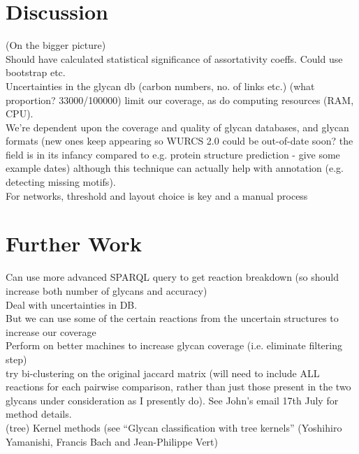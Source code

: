 \documentclass[12pt,a4paper]{article}
\begin{document}
\newpage
\section{Discussion}
\label{sec:discussion}
(On the bigger picture)\\
Should have calculated statistical significance of assortativity coeffs. Could use bootstrap etc.\\

Uncertainties in the glycan db (carbon numbers, no. of links etc.) (what proportion? 33000/100000) limit our coverage, as do computing resources (RAM, CPU).\\

We're dependent upon the coverage and quality of glycan databases, and glycan formats (new ones keep appearing so WURCS 2.0 could be out-of-date soon? the field is in its infancy compared to e.g. protein structure prediction - give some example dates) although this technique can actually help with annotation (e.g. detecting missing motifs).\\

For networks, threshold and layout choice is key and a manual process\\


\newpage
\section{Further Work}
\label{sec:further_work}

Can use more advanced SPARQL query to get reaction breakdown (so should increase both number of glycans and accuracy)\\

Deal with uncertainties in DB.\\
But we can use some of the certain reactions from the uncertain structures to increase our coverage\\

Perform on better machines to increase glycan coverage (i.e. eliminate filtering step)\\

try bi-clustering on the original jaccard matrix (will need to include ALL reactions for each pairwise comparison, rather than just those present in the two glycans under consideration as I presently do). See John's email 17th July for method details.\\

(tree) Kernel methods (see “Glycan classification with tree kernels” (Yoshihiro Yamanishi, Francis Bach and Jean-Philippe Vert) \\
\end{document}

